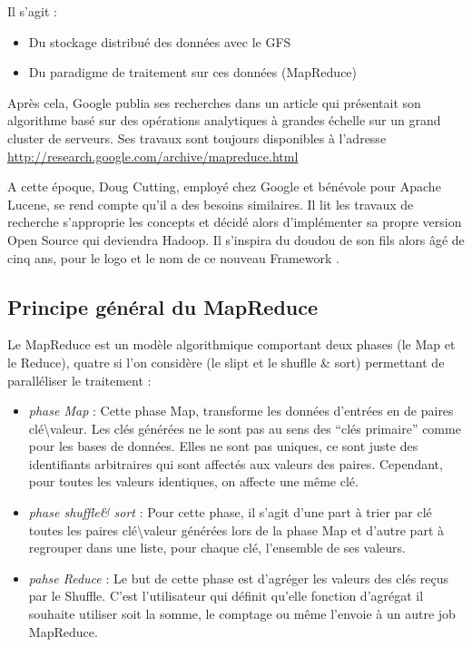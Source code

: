 Il s’agit :  
\begin{itemize}
    \item Du stockage distribué des données avec le GFS 
    \item Du paradigme de traitement sur ces données (MapReduce)  
\end{itemize}

Après cela, Google publia ses recherches dans un article qui présentait son algorithme basé sur des opérations analytiques à grandes échelle sur un grand cluster de serveurs. Ses travaux sont toujours disponibles à l’adresse \url{http://research.google.com/archive/mapreduce.html} 

A cette époque, Doug Cutting, employé chez Google et bénévole pour Apache Lucene, se rend compte qu’il a des besoins similaires. Il lit les travaux de recherche s’approprie les concepts et décidé alors d’implémenter sa propre version Open Source qui deviendra Hadoop. Il s’inspira du doudou de son fils alors âgé de cinq ans, pour le logo et le nom de ce nouveau Framework
.
\subsection{Principe général du MapReduce}
Le MapReduce est un modèle algorithmique comportant
deux phases (le Map et le Reduce), quatre si l’on considère (le slipt et le shuflle \& sort) permettant de paralléliser le traitement :
 

\begin{itemize}
    \item \emph{phase Map} : Cette phase Map, transforme les données d’entrées en de paires clé\textbackslash valeur. Les clés générées ne le sont pas au sens des “clés primaire” comme pour les bases de données. Elles ne sont pas uniques, ce sont juste des identifiants arbitraires qui sont affectés aux valeurs des paires. Cependant, pour toutes les valeurs identiques, on affecte une même clé.

    \item \emph{phase shuffle\& sort} :  Pour cette phase, il s’agit d’une part à trier par clé toutes les paires clé\textbackslash valeur générées lors de la phase Map et d’autre part à regrouper dans une liste, pour chaque clé, l’ensemble de ses valeurs.

    \item \emph{pahse Reduce} :  Le but de cette phase est d’agréger les valeurs des clés reçus par le Shuffle. C’est l’utilisateur qui définit qu’elle fonction d’agrégat il souhaite utiliser soit la somme, le comptage ou même l’envoie à un autre job MapReduce. 

\end{itemize}

